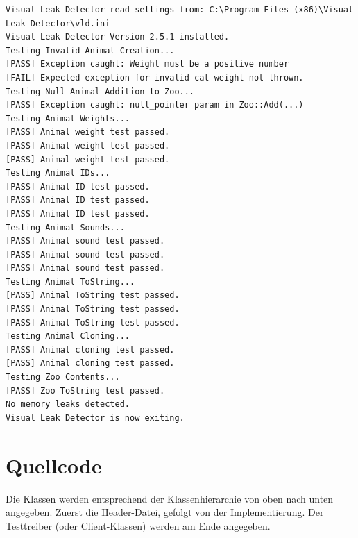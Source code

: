 \documentclass[12pt,naustrian,a4widepaper]{scrartcl}
\begin{document}
\begin{verbatim}
Visual Leak Detector read settings from: C:\Program Files (x86)\Visual Leak Detector\vld.ini
Visual Leak Detector Version 2.5.1 installed.
Testing Invalid Animal Creation...
[PASS] Exception caught: Weight must be a positive number
[FAIL] Expected exception for invalid cat weight not thrown.
Testing Null Animal Addition to Zoo...
[PASS] Exception caught: null_pointer param in Zoo::Add(...)
Testing Animal Weights...
[PASS] Animal weight test passed.
[PASS] Animal weight test passed.
[PASS] Animal weight test passed.
Testing Animal IDs...
[PASS] Animal ID test passed.
[PASS] Animal ID test passed.
[PASS] Animal ID test passed.
Testing Animal Sounds...
[PASS] Animal sound test passed.
[PASS] Animal sound test passed.
[PASS] Animal sound test passed.
Testing Animal ToString...
[PASS] Animal ToString test passed.
[PASS] Animal ToString test passed.
[PASS] Animal ToString test passed.
Testing Animal Cloning...
[PASS] Animal cloning test passed.
[PASS] Animal cloning test passed.
Testing Zoo Contents...
[PASS] Zoo ToString test passed.
No memory leaks detected.
Visual Leak Detector is now exiting.
\end{verbatim}

\clearpage
\section{Quellcode}
\color{blue}
Die Klassen werden entsprechend der Klassenhierarchie von oben nach unten angegeben. Zuerst die Header-Datei, gefolgt von der Implementierung.
Der Testtreiber (oder Client-Klassen) werden am Ende angegeben.
\color{black}

%


\end{document}
